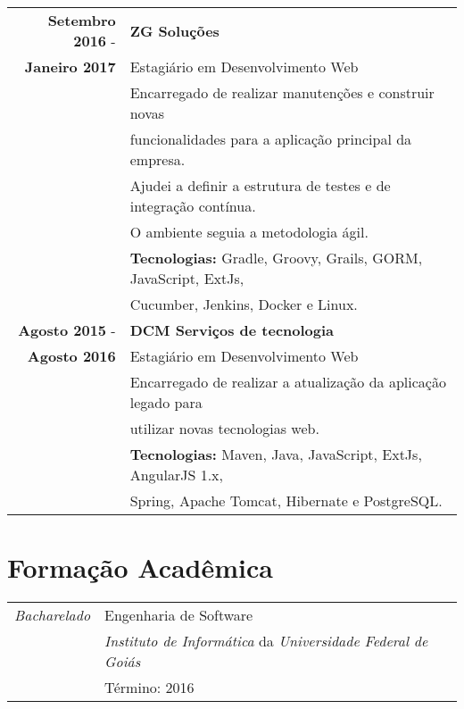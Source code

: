\documentclass[a4paper,10pt]{article} %
\begin{document}
\begin{tabular}{r|l}
	\textbf{Setembro 2016} - & \textbf{ZG Soluções}\\
	\textbf{Janeiro 2017} & Estagiário em Desenvolvimento Web \\
	& Encarregado de realizar manutenções e construir novas\\
	& funcionalidades para a aplicação principal da empresa.\\
	& Ajudei a definir a estrutura de testes e de integração contínua.\\
	& O ambiente seguia a metodologia ágil.\\
	& \textbf{Tecnologias:} Gradle, Groovy, Grails, GORM, JavaScript, ExtJs, \\
	& Cucumber, Jenkins, Docker e Linux. \\
	\textbf{Agosto 2015} - & \textbf{DCM Serviços de tecnologia} \\
	\textbf{Agosto 2016} & Estagiário em Desenvolvimento Web \\
	& Encarregado de realizar a atualização da aplicação legado para \\
	& utilizar novas tecnologias web. \\
	& \textbf{Tecnologias:} Maven, Java, JavaScript, ExtJs, AngularJS 1.x, \\
	& Spring, Apache Tomcat, Hibernate e PostgreSQL. \\
\end{tabular}


\section{Formação Acadêmica}

\begin{tabular}{r|p{11cm}}
	\emph{Bacharelado} & Engenharia de Software \\
	& \emph{Instituto de Informática} da \emph{Universidade Federal de Goiás} \\
	& Término: 2016\\
\end{tabular}

\end{document}
